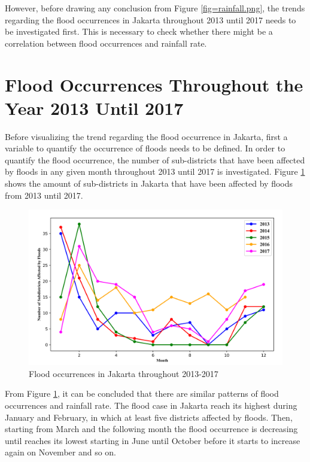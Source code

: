 \noindent
However, before drawing any conclusion from Figure \ref{fig=rainfall.png}, the trends regarding the flood occurrences in Jakarta throughout 2013 until 2017 needs to be investigated first. This is necessary to check whether there might be a correlation between flood occurrences and rainfall rate.

\section{Flood Occurrences Throughout the Year 2013 Until 2017}

Before visualizing the trend regarding the flood occurrence in Jakarta, first a variable to quantify the occurrence of floods needs to be defined. In order to quantify the flood occurrence, the number of sub-districts that have been affected by floods in any given month throughout 2013 until 2017 is investigated. Figure \ref{fig=flood.png} shows the amount of sub-districts in Jakarta that have been affected by floods from 2013 until 2017.\\

\begin{figure}
\begin{center}
\graphicspath{ {./Pict/} }
\includegraphics[scale=0.15]{flood.png}
\caption{Flood occurrences in Jakarta throughout 2013-2017}\label{fig=flood.png}
\end{center}
\end{figure}

\noindent
From Figure \ref{fig=flood.png}, it can be concluded that there are similar patterns of flood occurrences and rainfall rate. The flood case in Jakarta reach its highest during January and February, in which at least five districts affected by floods. Then, starting from March and the following month the flood occurrence is decreasing until reaches its lowest starting in June until October before it starts to increase again on November and so on.\\

